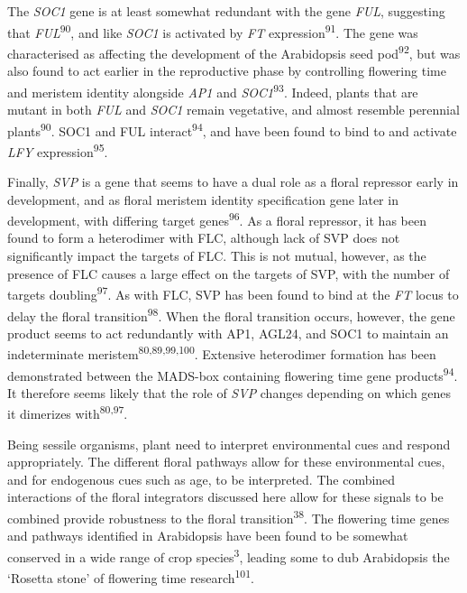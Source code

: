 \documentclass[12pt,]{book}
\begin{document}
The \emph{SOC1} gene is at least somewhat redundant with the gene
\emph{FUL}, suggesting that \emph{FUL}\textsuperscript{90}, and like
\emph{SOC1} is activated by \emph{FT} expression\textsuperscript{91}.
The gene was characterised as affecting the development of the
Arabidopsis seed pod\textsuperscript{92}, but was also found to act
earlier in the reproductive phase by controlling flowering time and
meristem identity alongside \emph{AP1} and
\emph{SOC1}\textsuperscript{93}. Indeed, plants that are mutant in both
\emph{FUL} and \emph{SOC1} remain vegetative, and almost resemble
perennial plants\textsuperscript{90}. SOC1 and FUL
interact\textsuperscript{94}, and have been found to bind to and
activate \emph{LFY} expression\textsuperscript{95}.

Finally, \emph{SVP} is a gene that seems to have a dual role as a floral
repressor early in development, and as floral meristem identity
specification gene later in development, with differing target
genes\textsuperscript{96}. As a floral repressor, it has been found to
form a heterodimer with FLC, although lack of SVP does not significantly
impact the targets of FLC. This is not mutual, however, as the presence
of FLC causes a large effect on the targets of SVP, with the number of
targets doubling\textsuperscript{97}. As with FLC, SVP has been found to
bind at the \emph{FT} locus to delay the floral
transition\textsuperscript{98}. When the floral transition occurs,
however, the gene product seems to act redundantly with AP1, AGL24, and
SOC1 to maintain an indeterminate
meristem\textsuperscript{80,89,99,100}. Extensive heterodimer formation
has been demonstrated between the MADS-box containing flowering time
gene products\textsuperscript{94}. It therefore seems likely that the
role of \emph{SVP} changes depending on which genes it dimerizes
with\textsuperscript{80,97}.

Being sessile organisms, plant need to interpret environmental cues and
respond appropriately. The different floral pathways allow for these
environmental cues, and for endogenous cues such as age, to be
interpreted. The combined interactions of the floral integrators
discussed here allow for these signals to be combined provide robustness
to the floral transition\textsuperscript{38}. The flowering time genes
and pathways identified in Arabidopsis have been found to be somewhat
conserved in a wide range of crop species\textsuperscript{3}, leading
some to dub Arabidopsis the `Rosetta stone' of flowering time
research\textsuperscript{101}.
\end{document}
